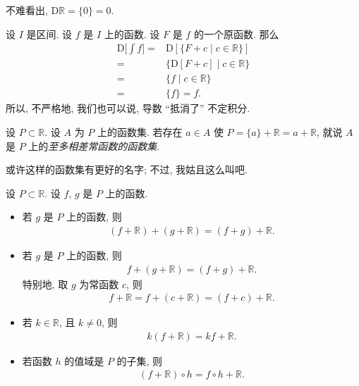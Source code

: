 \begin{example}
    不难看出, $\mathrm{D} \mathbb{R} = \{ 0 \} = 0$.
\end{example}

设 $I$ 是区间. 设 $f$ 是 $I$ 上的函数. 设 $F$ 是 $f$ 的一个原函数. 那么
\begin{align*}
    \mathrm{D} \Bigg[ \int {f} \Bigg]
    = {} & \mathrm{D} [\{ F + c \mid \text{$c \in \mathbb{R}$} \}] \\
    = {} & \{ \mathrm{D}[F + c] \mid \text{$c \in \mathbb{R}$} \}  \\
    = {} & \{ f \mid \text{$c \in \mathbb{R}$} \}                  \\
    = {} & \{ f \}  = f.
\end{align*}
所以, 不严格地, 我们也可以说, 导数 ``抵消了'' 不定积分.

\begin{definition}
    设 $P \subset \mathbb{R}$. 设 $A$ 为 $P$ 上的函数集. 若存在 $a \in A$ 使 $P = \{ a \} + \mathbb{R} = a + \mathbb{R}$, 就说 $A$ 是 $P$ 上的\emph{至多相差常函数的函数集}.
\end{definition}

\begin{remark}
    或许这样的函数集有更好的名字; 不过, 我姑且这么叫吧.
\end{remark}

\begin{theorem}
    设 $P \subset \mathbb{R}$. 设 $f$, $g$ 是 $P$ 上的函数.
    \begin{itemize}
        \item 若 $g$ 是 $P$ 上的函数, 则
              \begin{align*}
                  (f + \mathbb{R}) + (g + \mathbb{R}) = (f + g) + \mathbb{R}.
              \end{align*}
        \item 若 $g$ 是 $P$ 上的函数, 则
              \begin{align*}
                  f + (g + \mathbb{R}) = (f + g) + \mathbb{R}.
              \end{align*}
              特别地, 取 $g$ 为常函数 $c$, 则
              \begin{align*}
                  f + \mathbb{R} = f + (c + \mathbb{R}) = (f + c) + \mathbb{R}.
              \end{align*}
        \item 若 $k \in \mathbb{R}$, 且 $k \neq 0$, 则
              \begin{align*}
                  k(f + \mathbb{R}) = kf + \mathbb{R}.
              \end{align*}
        \item 若函数 $h$ 的值域是 $P$ 的子集, 则
              \begin{align*}
                  (f + \mathbb{R}) \circ h = f \circ h + \mathbb{R}.
              \end{align*}
    \end{itemize}
\end{theorem}

